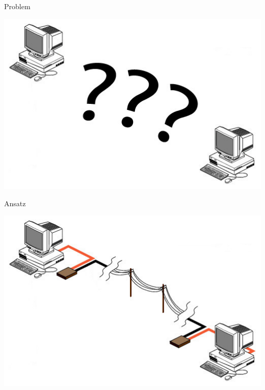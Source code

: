 \documentclass[beamer]{uibk}
\begin{document}
\begin{frame}{Problem}
  \begin{center}
  \includegraphics[width=\textwidth,height=\textheight,keepaspectratio]{ansatz_2.jpg}
  \end{center}
\end{frame}

\begin{frame}{Ansatz}
  \begin{center}
  \includegraphics[width=\textwidth,height=\textheight,keepaspectratio]{ansatz_3.jpg}
  \end{center}
\end{frame}
\end{document}
